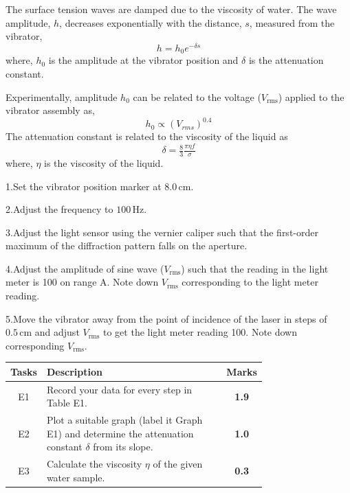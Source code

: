 The surface tension waves are damped due to the viscosity of water. The wave
amplitude, $h$, decreases exponentially with the distance, $s$, measured from
the vibrator,
\begin{equation}
h = h_0 e^{-\delta s} \tag{3}
\end{equation}
where, $h_0$ is the amplitude at the vibrator position and $\delta$ is the
attenuation constant.

Experimentally, amplitude $h_0$ can be related to the voltage
($V_\mathrm{rms}$) applied to the vibrator assembly as,
\begin{equation}
h_0 \propto (V_{rms})^{0.4} \tag{4}
\end{equation}
The attenuation constant is related to the viscosity of the liquid as
\begin{equation}
\delta = \tfrac{8}{3}\tfrac{\pi\eta f}{\sigma} \tag{5}
\end{equation}
where, $\eta$ is the viscosity of the liquid.

\hspace*{1em}1.\quad Set the vibrator position marker at $8.0\,\mathrm{cm}$.

\hspace*{1em}2.\quad Adjust the frequency to $100\,\mathrm{Hz}$.

\hspace*{1em}3.\quad Adjust the light sensor using the vernier caliper such
that the first-order maximum of the diffraction pattern falls on the aperture.

\hspace*{1em}4.\quad Adjust the amplitude of sine wave ($V_\mathrm{rms}$) such
that the reading in the light meter is 100 on range A. Note down
$V_\mathrm{rms}$ corresponding to the light meter reading.

\hspace*{1em}5.\quad Move the vibrator away from the point of incidence of the
laser in steps of $0.5\,\mathrm{cm}$ and adjust $V_\mathrm{rms}$ to get the
light meter reading 100. Note down corresponding $V_\mathrm{rms}$.

\begin{center}
\begin{tabular}{|c|p{0.74\linewidth}|c|}
\hline
Tasks & \centering Description & Marks \\ \hline
E1 & Record your data for every step in Table E1. & \textbf{1.9} \\ \hline
E2 & Plot a suitable graph (label it Graph E1) and determine the attenuation
constant $\delta$ from its slope. & \textbf{1.0} \\ \hline
E3 & Calculate the viscosity $\eta$ of the given water sample. & \textbf{0.3} \\ \hline
\end{tabular}
\end{center}
